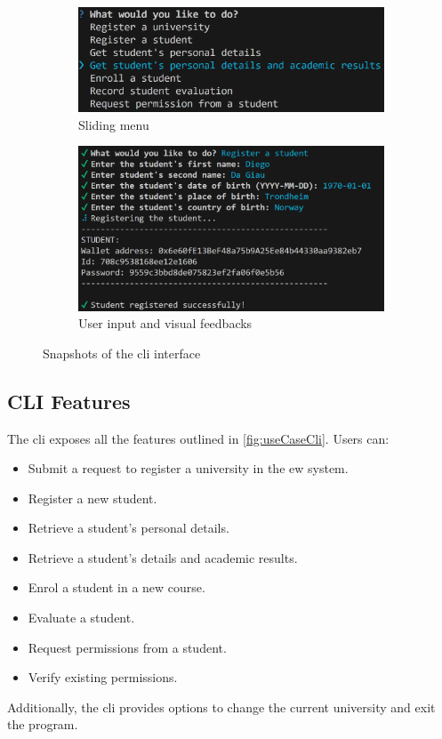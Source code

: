 \begin{figure}
    \centering
    \begin{subfigure}{.5\textwidth}
        \centering
        \includegraphics[width=\textwidth]{figures/CLI screen 1.png}
        \caption{Sliding menu}
        \label{sfig:cliDesign1}
    \end{subfigure}
    \hfill
    \begin{subfigure}{.60\textwidth}
        \centering
        \includegraphics[width=\textwidth]{figures/CLI screen 2.png}
        \caption{User input and visual feedbacks}
        \label{sfig:cliDesign2}
    \end{subfigure}
    \caption[Different aspects of the \gls{cli} interface.]{Snapshots of the \gls{cli} interface}
    \label{fig:clifigs}
\end{figure}

\subsection{CLI Features}
The \gls{cli} exposes all the features outlined in \cref{fig:useCaseCli}. Users can:
\begin{itemize}
    \item Submit a request to register a university in the \gls{ew} system.
    \item Register a new student.
    \item Retrieve a student’s personal details.
    \item Retrieve a student’s details and academic results.
    \item Enrol a student in a new course.
    \item Evaluate a student.
    \item Request permissions from a student.
    \item Verify existing permissions.
\end{itemize}
Additionally, the \gls{cli} provides options to change the current university and exit the program.


